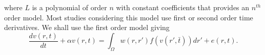 \documentclass[onecolumn,draftcls]{IEEEtran}
\begin{document}
where $L$ is a polynomial of order $n$ with constant coefficients that provides an $n^{th}$ order model. Most studies considering this model use first or second order time derivatives. We shall use the first order model giving
\begin{equation}\label{FinalForm1}
\frac{{dv\left( {r,t} \right)}}{{dt}} + \alpha{v\left( {r,t} \right)} = \int_\Omega  {w\left( {r,r'} \right)f\left( {v\left( {r',\bar t} \right)} \right)dr'}  +e\left( {r,t} \right).
\end{equation}
\end{document}
